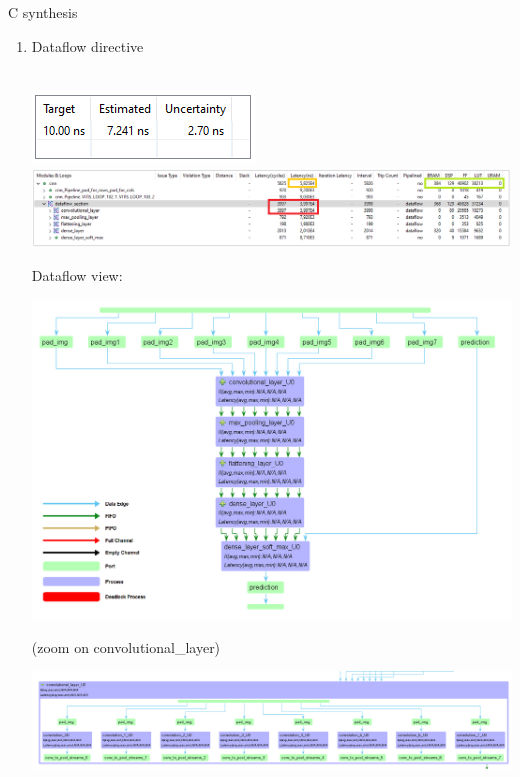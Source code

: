 \documentclass[10pt, xcolor=dvipsnames, compress]{beamer}
\begin{document}
\begin{frame}[allowframebreaks]{C synthesis}
\begin{enumerate}
        \item Dataflow directive\\~\

        \includegraphics[width=.2\textwidth]{Synthesis-result/opt_full_timing.png}
        \linebreak
        \includegraphics[width=\textwidth]{Synthesis-result/opt_full_detail.png}

    \framebreak
        Dataflow view:
        \begin{center}
            \includegraphics[width=.58\textwidth]{dataflow-view.png}
        \end{center}
        \tiny{(zoom on convolutional\_layer)}
        \begin{center}
            \includegraphics[width=.76\textwidth]{dataflow-view-zoom.png}
        \end{center}

    \end{enumerate}
\end{frame}
\end{document}
